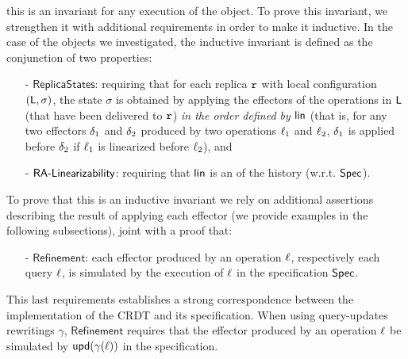 this is an invariant for any execution of the object.
%
To prove this invariant, we strengthen it with additional requirements
in order to make it inductive.
%
In the case of the objects we investigated, the inductive invariant is
defined as the conjunction of two properties:
\begin{itemize}
\item[-] $\mathsf{ReplicaStates}$: requiring that for each replica
  $\mathtt{r}$ with local configuration $(\mathsf{L},\sigma)$, the state
  $\sigma$ is obtained by applying the effectors of the operations
  in $\mathsf{L}$ (that have been delivered to $\mathtt{r}$) \emph{in the order
  defined by $\mathsf{lin}$} (that is, for any two effectors $\delta_1$ and $\delta_2$ produced by two operations $\ell_1$ and $\ell_2$,  
  $\delta_1$ is applied  before $\delta_2$ if $\ell_1$ is linearized before $\ell_2$), and
\item[-] $\mathsf{RA\text{-}Linearizability{}}$: requiring that $\mathsf{lin}$ is an \crdtlinearization{} of the history (w.r.t. $\mathsf{Spec}{}$).
\end{itemize}
To prove that this is an inductive invariant we rely on additional
assertions describing the result of applying each effector (we provide
examples in the following subsections), joint with a proof that:
\begin{itemize}
\item[-] $\mathsf{Refinement}$: each effector produced by an operation
  $\ell$, respectively each query $\ell$, is simulated by the
  execution of $\ell$ in the specification $\mathsf{Spec}$. 
\end{itemize}
This last requirements establishes a strong
correspondence between the implementation of the CRDT and its
specification. When using query-updates rewritings $\gamma$, $\mathsf{Refinement}$ requires that 
the effector produced by an operation $\ell$ be simulated by $\mathsf{upd}(\gamma(\ell))$ 
in the specification. 

